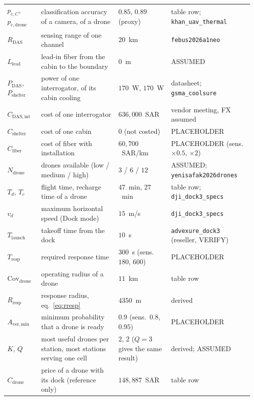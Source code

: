 \documentclass[11pt,a4paper]{article}
\newcommand{\src}[1]{\texttt{#1}}
\begin{document}
\begin{longtable}{@{}p{2.9cm}p{5.6cm}p{3.2cm}p{3.6cm}@{}}
$p_{c,C}$, $p_{c,\mathrm{drone}}$ & classification accuracy of a camera, of a drone & $0.85$, $0.89$ (proxy) & table row; \src{khan\_uav\_thermal} \\
$R_{\mathrm{DAS}}$ & sensing range of one channel & $20$~km & \src{febus2026a1neo} \\
$L_{\mathrm{lead}}$ & lead-in fiber from the cabin to the boundary & $0$~m & ASSUMED \\
$P_{\mathrm{DAS}}$, $P_{\mathrm{shelter}}$ & power of one interrogator, of its cabin cooling & $170$~W, $170$~W & datasheet; \src{gsma\_coolsure} \\
$C_{\mathrm{DAS,int}}$ & cost of one interrogator & $636{,}000$~SAR & vendor meeting, FX assumed \\
$C_{\mathrm{shelter}}$ & cost of one cabin & $0$ (not costed) & PLACEHOLDER \\
$C_{\mathrm{fiber}}$ & cost of fiber with installation & $60{,}700$~SAR/km & PLACEHOLDER (sens.\ $\times0.5$, $\times2$) \\
$N_{\mathrm{drone}}$ & drones available (low / medium / high) & $3$ / $6$ / $12$ & ASSUMED; \src{yenisafak2026drones} \\
$T_{d}$, $T_{c}$ & flight time, recharge time of a drone & $47$~min, $27$~min & table row; \src{dji\_dock3\_specs} \\
$v_{d}$ & maximum horizontal speed (Dock mode) & $15$~m/s & \src{dji\_dock3\_specs} \\
$T_{\mathrm{launch}}$ & takeoff time from the dock & $10$~s & \src{advexure\_dock3} (reseller, VERIFY) \\
$T_{\mathrm{resp}}$ & required response time & $300$~s (sens.\ $180$, $600$) & PLACEHOLDER \\
$\mathrm{Cov}_{\mathrm{drone}}$ & operating radius of a drone & $11$~km & table row \\
$R_{\mathrm{resp}}$ & response radius, eq.~\eqref{eq:rresp} & $4350$~m & derived \\
$A_{\mathrm{ver,min}}$ & minimum probability that a drone is ready & $0.9$ (sens.\ $0.8$, $0.95$) & PLACEHOLDER \\
$K$, $Q$ & most useful drones per station, most stations serving one cell & $2$, $2$ ($Q=3$ gives the same result) & derived; ASSUMED \\
$C_{\mathrm{drone}}$ & price of a drone with its dock (reference only) & $148{,}887$~SAR & table row \\
\end{longtable}
\end{document}
